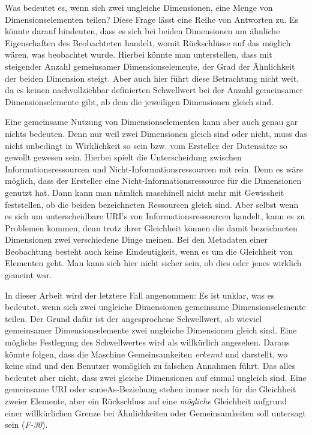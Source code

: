 \documentclass[11pt]{article}
\newcommand{\com}[1]{\marginpar{\em {\small{#1}}}} %
\begin{document}
Was bedeutet es, wenn sich zwei ungleiche Dimensionen, eine Menge von Dimensionselementen teilen? Diese Frage lässt eine Reihe von Antworten zu. Es könnte darauf hindeuten, dass es sich bei beiden Dimensionen um ähnliche Eigenschaften des Beobachteten handelt, womit Rückschlüsse auf das möglich wären, was beobachtet wurde. Hierbei könnte man unterstellen, dass mit steigender Anzahl gemeinsamer Dimensionselemente, der Grad der Ähnlichkeit der beiden Dimension steigt. Aber auch hier führt diese Betrachtung nicht weit, da es keinen nachvollziehbar definierten Schwellwert bei der Anzahl gemeinsamer Dimensionselemente gibt, ab dem die jeweiligen Dimensionen gleich sind.

Eine gemeinsame Nutzung von Dimensionselementen kann aber auch genau gar nichts bedeuten. Denn nur weil zwei Dimensionen gleich sind oder nicht, muss das nicht unbedingt in Wirklichkeit so sein bzw. vom Ersteller der Datensätze so gewollt gewesen sein. Hierbei spielt die Unterscheidung zwischen Informationsressourcen und Nicht-Informationsressourcen mit rein. Denn es wäre möglich, dass der Ersteller eine Nicht-Informationsressource für die Dimensionen genutzt hat. Dann kann man nämlich maschinell nicht mehr mit Gewissheit feststellen, ob die beiden bezeichneten Ressourcen gleich sind. Aber selbst wenn es sich um unterscheidbare URI's von Informationsressourcen handelt, kann es zu Problemen kommen, denn trotz ihrer Gleichheit können die damit bezeichneten Dimensionen zwei verschiedene Dinge meinen. Bei den Metadaten einer Beobachtung besteht auch keine Eindeutigkeit, wenn es um die Gleichheit von Elementen geht. Man kann sich hier nicht sicher sein, ob dies oder jenes wirklich gemeint war. 

In dieser Arbeit wird der letztere Fall angenommen: Es ist unklar, was es bedeutet, wenn sich zwei ungleiche Dimensionen gemeinsame Dimensionselemente teilen. Der Grund dafür ist der angesprochene Schwellwert, ab wieviel gemeinsamer Dimensionselemente zwei ungleiche Dimensionen gleich sind. Eine mögliche Festlegung des Schwellwertes wird als willkürlich angesehen. Daraus könnte folgen, dass die Maschine Gemeinsamkeiten \emph{erkennt} und darstellt, wo keine sind und den Benutzer womöglich zu falschen Annahmen führt. Das alles bedeutet aber nicht, dass zwei gleiche Dimensionen auf einmal ungleich sind. Eine gemeinsame URI oder sameAs-Beziehung stehen immer noch für die Gleichheit zweier Elemente, aber ein Rückschluss auf eine \emph{mögliche} Gleichheit aufgrund einer willkürlichen Grenze\com{Anforderung \\ F-30, S. \pageref{req:F30}} bei Ähnlichkeiten oder Gemeinsamkeiten soll untersagt sein (\textit{F-30})\label{req:F30source}.
\end{document}
